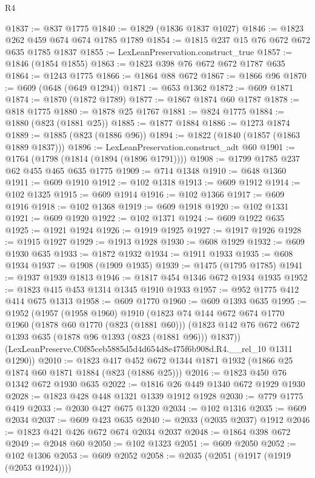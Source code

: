 \begin{lexlean}{R4}
\begin{coremodule}
@1837 := @837 @1775
@1840 := @1829 (@1836 @1837 @1027)
@1846 := @1823 @262 @459 @674 @674 @1785 @1789
@1854 := @1815 @237 @15 @76 @672 @672 @635 @1785 @1837
@1855 := LexLeanPreservation.construct_true
@1857 := @1846 (@1854 @1855)
@1863 := @1823 @398 @76 @672 @672 @1787 @635
@1864 := @1243 @1775
@1866 := @1864 @88 @672
@1867 := @1866 @96
@1870 := @609 (@648 (@649 @1294))
@1871 := @653 @1362
@1872 := @609 @1871
@1874 := @1870 (@1872 @1789)
@1877 := @1867 @1874 @60 @1787
@1878 := @818 @1775
@1880 := @1878 @25 @1767
@1881 := @824 @1775
@1884 := @1880 (@823 (@1881 @25))
@1885 := @1877 @1884
@1886 := @1273 @1874
@1889 := @1885 (@823 (@1886 @96))
@1894 := @1822 (@1840 (@1857 (@1863 @1889 @1837)))
@1896 := LexLeanPreservation.construct_adt @60
@1901 := @1764 (@1798 (@1814 (@1894 (@1896 @1791))))
@1908 := @1799 @1785 @237 @62 @455 @465 @635 @1775
@1909 := @714 @1348
@1910 := @648 @1360
@1911 := @609 @1910
@1912 := @102 @1318
@1913 := @609 @1912
@1914 := @102 @1325
@1915 := @609 @1914
@1916 := @102 @1366
@1917 := @609 @1916
@1918 := @102 @1368
@1919 := @609 @1918
@1920 := @102 @1331
@1921 := @609 @1920
@1922 := @102 @1371
@1924 := @609 @1922 @635
@1925 := @1921 @1924
@1926 := @1919 @1925
@1927 := @1917 @1926
@1928 := @1915 @1927
@1929 := @1913 @1928
@1930 := @608 @1929
@1932 := @609 @1930 @635
@1933 := @1872 @1932
@1934 := @1911 @1933
@1935 := @608 @1934
@1937 := @1908 (@1909 @1935)
@1939 := @1475 (@1795 @1785)
@1941 := @1937 @1939 @1813
@1946 := @1817 @454 @1346 @672 @1934 @1935
@1952 := @1823 @415 @453 @1314 @1345 @1910 @1933
@1957 := @952 @1775 @412 @414 @675 @1313
@1958 := @609 @1770
@1960 := @609 @1393 @635
@1995 := @1952
    (@1957
      (@1958 @1960)
      @1910
      (@1823
        @74
        @144
        @672
        @674
        @1770
        @1960
        (@1878 @60 @1770 (@823 (@1881 @60)))
        (@1823 @142 @76 @672 @672 @1393 @635 (@1878 @96 @1393 (@823 (@1881 @96))) @1837))
      (LexLeanPreserve.C0f85ceb5885d5d4d654d8e475f6b908d.R4.__rel_10 @1311 @1290))
@2010 := @1823 @417 @452 @672 @1344 @1871 @1932 (@1866 @25 @1874 @60 @1871 @1884 (@823 (@1886 @25)))
@2016 := @1823 @450 @76 @1342 @672 @1930 @635
@2022 := @1816 @26 @449 @1340 @672 @1929 @1930
@2028 := @1823 @428 @448 @1321 @1339 @1912 @1928
@2030 := @779 @1775 @419
@2033 := @2030 @427 @675 @1320
@2034 := @102 @1316
@2035 := @609 @2034
@2037 := @609 @423 @635
@2040 := @2033 (@2035 @2037) @1912
@2046 := @1823 @421 @426 @672 @674 @2034 @2037
@2048 := @1864 @398 @672
@2049 := @2048 @60
@2050 := @102 @1323
@2051 := @609 @2050
@2052 := @102 @1306
@2053 := @609 @2052
@2058 := @2035 (@2051 (@1917 (@1919 (@2053 @1924))))

\end{coremodule}
\end{lexlean}
